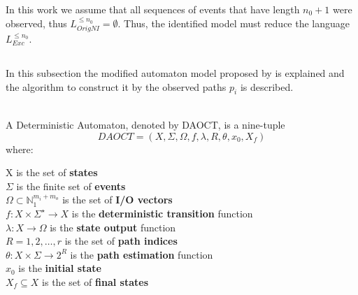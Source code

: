 In this work we assume that all
sequences of events that have length $n_0+1$ were observed, thus
$L_{OrigNI}^{\leq n_0}=\emptyset$.
Thus, the identified model must reduce the language $L_{Exc}^{\leq n_0}$.
\newpage
\subsection{}
In this subsection the modified automaton model proposed by
\cite{moreira2018enhanced} is explained and the algorithm to construct it
by the observed paths $p_i$ is described. 
\begin{definition}[DAOCT]
  \label{def:daoct}~\\
  A Deterministic Automaton, denoted by DAOCT, is a nine-tuple
  \[ DAOCT = (X,\Sigma,\Omega,f,\lambda,R,\theta, x_0,X_f)\] where:

  \indent X is the set of \textbf{states} \\
  \indent $\Sigma$ is the finite set of \textbf{events}\\
  \indent $\Omega \subset \mathbb{N}_1^{m_i+m_o} $ is the set of \textbf{I/O vectors}\\
  \indent $f:  X \times \Sigma^\star \rightarrow X$ is the \textbf{deterministic transition} function  \\
  \indent $\lambda : X \rightarrow \Omega$ is the \textbf{state output} function \\
  \indent $R = {1,2,\dots,r}$ is the set of \textbf{path indices} \\
  \indent $\theta : X \times \Sigma \rightarrow 2^R$ is the \textbf{path
    estimation} function \\
  \indent $x_0$ is the \textbf{initial state} \\
  \indent $X_f \subseteq X $ is the set of \textbf{final states}
\end{definition}

